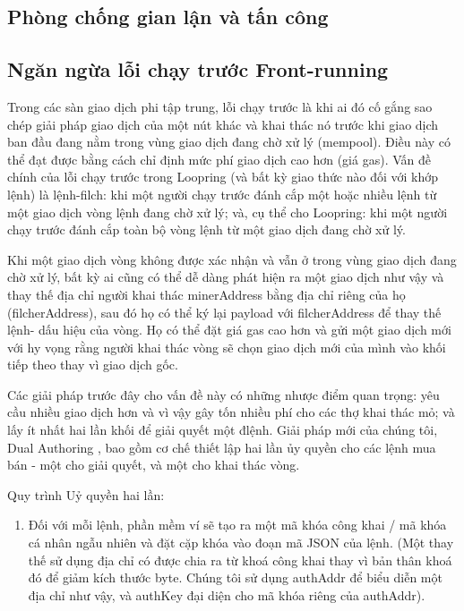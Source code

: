\documentclass[12pt,a4paper]{article}
\begin{document}
\begin{multicols}{2}
\section{Phòng chống gian lận và tấn công}

\subsection{Ngăn ngừa lỗi chạy trước Front-running \label{sec:dual_authoring}}
Trong các sàn giao dịch phi tập trung, lỗi chạy trước là khi ai đó cố gắng sao chép giải pháp giao dịch của một nút khác và khai thác nó trước khi giao dịch ban đầu đang nằm trong vùng giao dịch đang chờ xử lý (mempool). Điều này có thể đạt được bằng cách chỉ định mức phí giao dịch cao hơn (giá gas). Vấn đề chính của lỗi chạy trước trong Loopring (và bất kỳ giao thức nào đối với khớp lệnh) là lệnh-filch: khi một người chạy trước đánh cắp một hoặc nhiều lệnh từ một giao dịch vòng lệnh đang chờ xử lý; và, cụ thể cho Loopring: khi một người chạy trước đánh cắp toàn bộ vòng lệnh từ một giao dịch đang chờ xử lý.

Khi một giao dịch vòng không được xác nhận và vẫn ở trong vùng giao dịch đang chờ xử lý, bất kỳ ai cũng có thể dễ dàng phát hiện ra một giao dịch như vậy và thay thế địa chỉ người khai thác minerAddress bằng địa chỉ riêng của họ (filcherAddress), sau đó họ có thể ký lại payload với filcherAddress để thay thế lệnh- dấu hiệu của vòng. Họ có thể đặt giá gas cao hơn và gửi một giao dịch mới với hy vọng rằng người khai thác vòng sẽ chọn giao dịch mới của mình vào khối tiếp theo thay vì giao dịch gốc.

Các giải pháp trước đây cho vấn đề này có những nhược điểm quan trọng: yêu cầu nhiều giao dịch hơn và vì vậy gây tốn nhiều phí cho các thợ khai thác mỏ; và lấy ít nhất hai lần khối để giải quyết một đlệnh. Giải pháp mới của chúng tôi, Dual Authoring \cite{dualauthor}, bao gồm cơ chế thiết lập hai lần ủy quyền cho các lệnh mua bán - một cho giải quyết, và một cho khai thác vòng.

Quy trình Uỷ quyền hai lần:
\begin{enumerate}

	\item Đối với mỗi lệnh, phần mềm ví sẽ tạo ra một mã khóa công khai / mã khóa cá nhân ngẫu nhiên và đặt cặp khóa vào đoạn mã JSON của lệnh. (Một thay thế sử dụng địa chỉ có được chia ra từ khoá công khai thay vì bản thân khoá đó để giảm kích thước byte. Chúng tôi sử dụng authAddr để biểu diễn một địa chỉ như vậy, và authKey đại diện cho mã khóa riêng của authAddr).


\end{enumerate}
\end{multicols}
\end{document}
